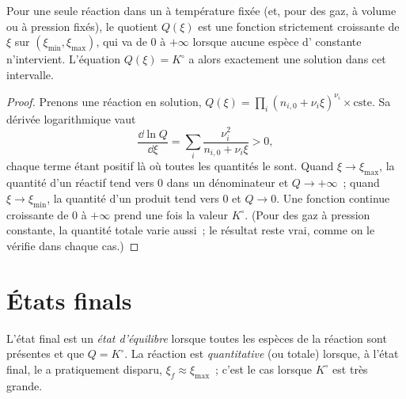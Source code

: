 \begin{proposition}\label{prop:b1:extent-q-and-k:q-monotone}
Pour une seule réaction dans un  à température fixée (et,
pour des gaz, à volume ou à pression fixés), le quotient $Q(\xi)$ est
une fonction strictement croissante de $\xi$ sur
$(\xi_{\min}, \xi_{\max})$, qui va de 0 à $+\infty$ lorsque aucune
espèce d' constante n'intervient. L'équation $Q(\xi) = K^\circ$
a alors exactement une solution dans cet intervalle.
\end{proposition}

\begin{proof}
Prenons une réaction en solution, $Q(\xi) = \prod_i (n_{i,0} + \nu_i\xi)^{\nu_i}
\times \text{cste}$. Sa dérivée logarithmique vaut
\[
  \frac{\dd \ln Q}{\dd \xi} = \sum_i \frac{\nu_i^2}{n_{i,0} + \nu_i \xi}
  > 0 ,
\]
chaque terme étant positif là où toutes les quantités le sont. Quand
$\xi \to \xi_{\max}$, la quantité d'un réactif tend vers 0 dans un
dénominateur et $Q \to +\infty$~; quand $\xi
\to \xi_{\min}$, la quantité d'un produit tend vers 0 et $Q \to 0$. Une
fonction continue croissante de 0 à $+\infty$ prend une fois la valeur
$K^\circ$. (Pour des gaz à pression constante, la quantité totale varie
aussi~; le résultat reste vrai, comme on le vérifie dans chaque cas.)
\end{proof}

\section{États finals}

\begin{definition}\label{def:b1:extent-q-and-k:quantitative}
L'état final est un \emph{état d'équilibre}
lorsque toutes les espèces de la réaction sont présentes et que
$Q = K^\circ$. La réaction est \emph{quantitative} (ou totale)
lorsque, à l'état final, le  a pratiquement disparu,
$\xi_f \approx \xi_{\max}$~; c'est le cas lorsque $K^\circ$ est très
grande.
\end{definition}

